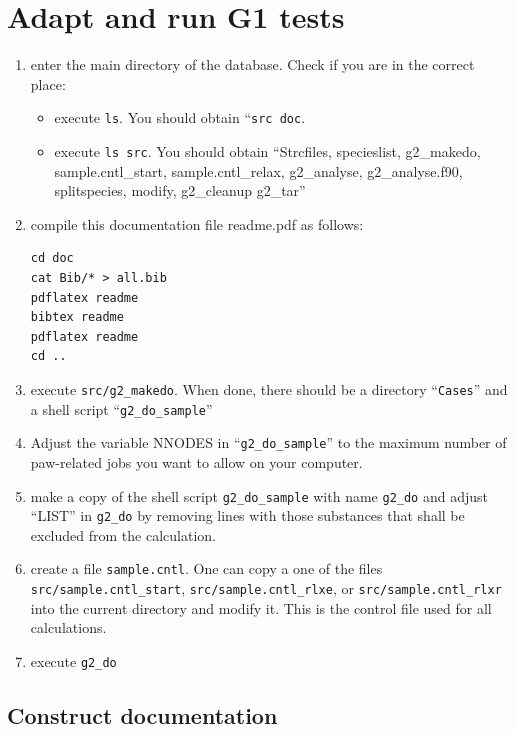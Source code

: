 \documentclass{book}
\begin{document}
\section*{Adapt and run G1 tests}
\begin{enumerate}
\item enter the main directory of the database. Check if you are in
  the correct place:
  \begin{itemize} 
    \item execute \verb|ls|. You should obtain ``\verb|src doc|. 
    \item execute \verb|ls src|. You should obtain ``Strcfiles,
      specieslist, g2\_makedo, sample.cntl\_start,
      sample.cntl\_relax, g2\_analyse, g2\_analyse.f90, splitspecies, 
      modify, g2\_cleanup g2\_tar''
   \end{itemize}
%
\item compile this documentation file readme.pdf as follows:
\begin{verbatim}
cd doc
cat Bib/* > all.bib
pdflatex readme
bibtex readme
pdflatex readme
cd ..
\end{verbatim}
%
\item execute \verb|src/g2_makedo|. When done, there should be a
  directory ``\verb|Cases|'' and a shell script ``\verb|g2_do_sample|''
%
\item Adjust the variable NNODES in ``\verb|g2_do_sample|'' to the
  maximum number of paw-related jobs you want to allow on your
  computer.
%
\item make a copy of the shell script \verb|g2_do_sample| with name
  \verb|g2_do| and adjust ``LIST'' in \verb|g2_do| by removing lines
  with those substances that shall be excluded from the calculation.
%
\item create a file \verb|sample.cntl|. One can copy a one of the
  files \verb|src/sample.cntl_start|, \verb|src/sample.cntl_rlxe|, or
  \verb|src/sample.cntl_rlxr| into the current directory and modify
  it. This is the control file used for all calculations.
%
\item execute \verb|g2_do|
%
\end{enumerate}

\subsection*{Construct documentation}
\end{document}
